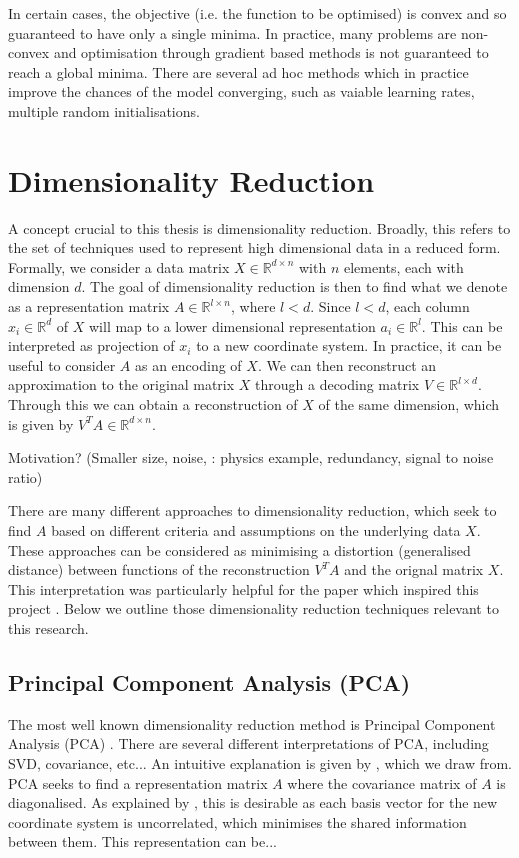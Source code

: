In certain cases, the objective (i.e. the function to be optimised) is convex and so guaranteed to have only a single minima. In practice, many problems are non-convex and optimisation through gradient based methods is not guaranteed to reach a global minima. There are several ad hoc methods which in practice improve the chances of the model converging, such as vaiable learning rates, multiple random initialisations.    






\section{Dimensionality Reduction}
\label{sec:dimred}

A concept crucial to this thesis is dimensionality reduction. Broadly, this refers to the set of techniques used to represent high dimensional data in a reduced form. Formally, we consider a data matrix $X \in \mathbb{R}^{d \times n}$ with $n$ elements, each with dimension $d$. The goal of dimensionality reduction is then to find what we denote as a representation matrix $A \in \mathbb{R}^{l \times n}$, where $l < d$. Since $l < d$, each column $x_i \in \mathbb{R}^d$ of $X$ will map to a lower dimensional representation $a_i \in \mathbb{R}^l$. This can be interpreted as projection of $x_i$ to a new coordinate system. In practice, it can be useful to consider $A$ as an encoding of $X$. We can then reconstruct an approximation to the original matrix $X$ through a decoding matrix $V \in \mathbb{R}^{l \times d}$. Through this we can obtain a reconstruction of $X$ of the same dimension, which is given by $V^TA \in \mathbb{R}^{d \times n}$. 

Motivation? (Smaller size, noise,  \citep{Shlens2005}: physics example, redundancy, signal to noise ratio)

There are many different approaches to dimensionality reduction, which seek to find $A$ based on different criteria and assumptions on the underlying data $X$. These approaches can be considered as minimising a distortion (generalised distance)  between functions of the reconstruction $V^TA$ and the orignal matrix $X$. This interpretation was particularly helpful for the paper which inspired this project \citep{Avalos2018}. Below we outline those dimensionality reduction techniques relevant to this research.    

\subsection{Principal Component Analysis (PCA)}
The most well known dimensionality reduction method is Principal Component Analysis (PCA) \citep{MackiewiczRatajczak1993}. There are several different interpretations of PCA, including SVD, covariance, etc... An intuitive explanation is given by \cite{Shlens2005}, which we draw from. PCA seeks to find a representation matrix $A$ where the covariance matrix of $A$ is diagonalised. As explained by \cite{Shlens2005}, this is desirable as each basis vector for the new coordinate system is uncorrelated, which minimises the shared information between them. This representation can be... 

